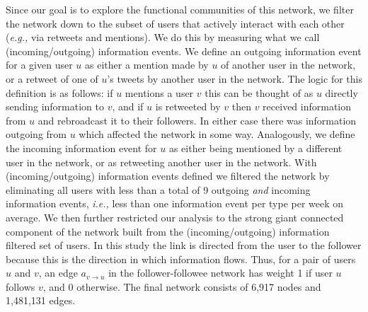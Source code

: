 Since our goal is to explore the functional communities of this network, we filter the network down to the subset of users that actively interact with each other ({\it e.g.,} via retweets and mentions). We do this by measuring what we call (incoming/outgoing) information events. We define an outgoing information event for a given user $u$ as either a mention made by $u$ of another user in the network, or a retweet of one of $u$'s tweets by another user in the network. The logic for this definition is as follows: if $u$ mentions a user $v$ this can be thought of as $u$ directly sending information to $v$, and if $u$ is retweeted by $v$ then $v$ received information from $u$ and rebroadcast it to their followers. In either case there was information outgoing from $u$ which affected the network in some way. Analogously, we define the incoming information event for $u$ as either being mentioned by a different user in the network, or as retweeting another user in the network.
With (incoming/outgoing) information events defined we filtered the network by eliminating all users with less than a total of 9 outgoing \emph{and} incoming information events, {\it i.e.,} less than one information event per type per week on average. 
We then further restricted our analysis to the strong giant connected component of the network built from the (incoming/outgoing) information filtered set of users. %
In this study the link is directed from the user to the follower because this is the direction in which information flows. Thus, for a pair of users $u$ and $v$, an edge $a_{v \to u}$ in the follower-followee network has weight 1 if user $u$ follows $v$, and 0 otherwise. The final network consists of 6,917 nodes and 1,481,131 edges.

